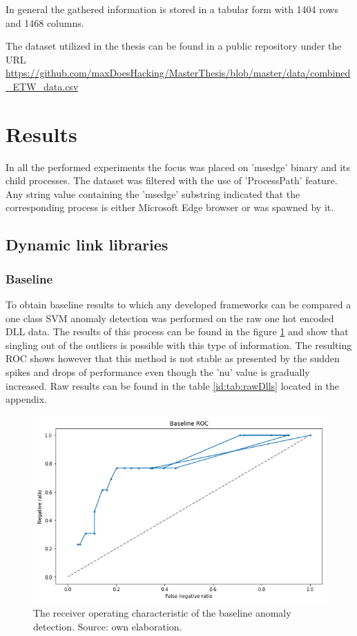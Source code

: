 \documentclass[a4paper,twoside,12pt]{book}
\begin{document}
In general the gathered information is stored in a tabular form with 1404 rows and 1468 columns. 

The dataset utilized in the thesis can be found in a public repository under the URL 
\url{https://github.com/maxDoesHacking/MasterThesis/blob/master/data/combined_ETW_data.csv}


\section{Results}

In all the performed experiments the focus was placed on 'msedge' binary and its child processes.
The dataset was filtered with the use of 'ProcessPath' feature. Any string value containing the 'msedge'
substring indicated that the corresponding process is either Microsoft Edge browser or was spawned by it. 

\subsection{Dynamic link libraries}
\subsubsection{Baseline}
To obtain baseline results to which any developed frameworks can be compared a one class SVM anomaly 
detection was performed on the raw one hot encoded DLL data. The results of this process can be found
in the figure \ref{fig:DLLBaselineROC} and show that singling out of the outliers is possible with this type 
of information. The resulting ROC shows however that this method is not stable as presented by the sudden spikes
and drops of performance even though the 'nu' value is gradually increased. 
Raw results can be found in the table \ref{id:tab:rawDlls} located in the appendix. 

\begin{figure}
	\centering
	\includegraphics{images/DLLBaselineROCKF}
	\caption{The receiver operating characteristic of the baseline anomaly detection. Source: own elaboration.}
	\label{fig:DLLBaselineROC}
 \end{figure}
\end{document}
